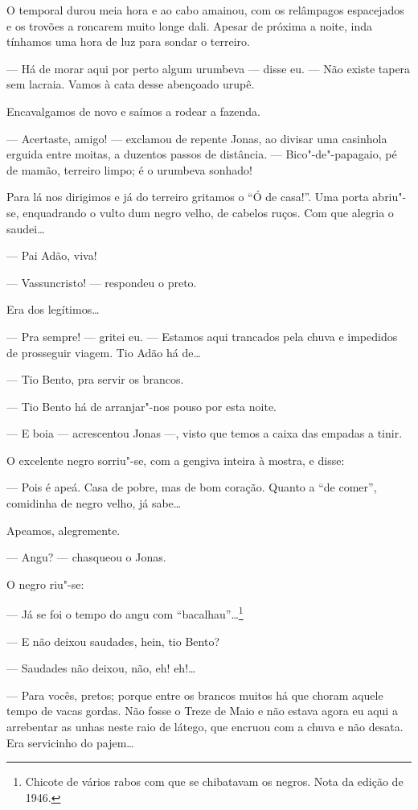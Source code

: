 O temporal durou meia hora e ao cabo amainou, com os relâmpagos
espacejados e os trovões a roncarem muito longe dali. Apesar de próxima
a noite, inda tínhamos uma hora de luz para sondar o terreiro.

--- Há de morar aqui por perto algum urumbeva --- disse eu. --- Não
existe tapera sem lacraia. Vamos à cata desse abençoado urupê.

Encavalgamos de novo e saímos a rodear a fazenda.

--- Acertaste, amigo! --- exclamou de repente Jonas, ao divisar uma
casinhola erguida entre moitas, a duzentos passos de distância. ---
Bico"-de"-papagaio, pé de mamão, terreiro limpo; é o urumbeva sonhado!

Para lá nos dirigimos e já do terreiro gritamos o ``Ó de casa!''. Uma
porta abriu"-se, enquadrando o vulto dum negro velho, de cabelos ruços.
Com que alegria o saudei\ldots{}

--- Pai Adão, viva!

--- Vassuncristo! --- respondeu o preto.

Era dos legítimos\ldots{}

--- Pra sempre! --- gritei eu. --- Estamos aqui trancados pela chuva e
impedidos de prosseguir viagem. Tio Adão há de\ldots{}

--- Tio Bento, pra servir os brancos.

--- Tio Bento há de arranjar"-nos pouso por esta noite.

--- E boia --- acrescentou Jonas ---, visto que temos a caixa das
empadas a tinir.

O excelente negro sorriu"-se, com a gengiva inteira à mostra, e disse:

--- Pois é apeá. Casa de pobre, mas de bom coração. Quanto a ``de
comer'', comidinha de negro velho, já sabe\ldots{}

Apeamos, alegremente.

--- Angu? --- chasqueou o Jonas.

O negro riu"-se:

--- Já se foi o tempo do angu com ``bacalhau''\ldots{}\footnote{Chicote de
  vários rabos com que se chibatavam os negros. Nota da edição de 1946.}

--- E não deixou saudades, hein, tio Bento?

--- Saudades não deixou, não, eh! eh!\ldots{}

--- Para vocês, pretos; porque entre os brancos muitos há que choram
aquele tempo de vacas gordas. Não fosse o Treze de Maio e não estava
agora eu aqui a arrebentar as unhas neste raio de látego, que encruou
com a chuva e não desata. Era servicinho do pajem\ldots{}

